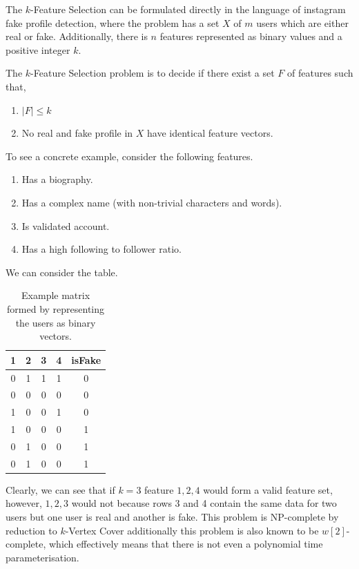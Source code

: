 \documentclass[conference]{IEEEtran}
\begin{document}
\begin{definition}\label{def:k-feature-selection}
	The $k$-Feature Selection can be formulated directly in the language of instagram fake profile detection, where the problem has a set $X$ of $m$ users which are either real or fake. Additionally, there is $n$ features represented as binary values and a positive integer $k$.

	The $k$-Feature Selection problem is to decide if there exist a set $F$ of features such that,

	\begin{enumerate}
		\item $|F| \leq k$
		\item No real and fake profile in $X$ have identical feature vectors.
	\end{enumerate}
\end{definition}

To see a concrete example, consider the following features.

\begin{enumerate}
	\item Has a biography.
	\item Has a complex name (with non-trivial characters and words).
	\item Is validated account.
	\item Has a high following to follower ratio.
\end{enumerate}

We can consider the table.

\begin{table}[h!]
	\centering
	\begin{tabular}{| c c c c | c |}
		\hline
		1 & 2 & 3 & 4 & isFake \\ [0.5ex]
		\hline
		0 & 1 & 1 & 1 & 0      \\
		0 & 0 & 0 & 0 & 0      \\
		1 & 0 & 0 & 1 & 0      \\
		1 & 0 & 0 & 0 & 1      \\
		0 & 1 & 0 & 0 & 1      \\
		0 & 1 & 0 & 0 & 1      \\ [1ex]
		\hline
	\end{tabular}
	\caption{Example matrix formed by representing the users as binary vectors.}
	\label{table:k-feat-select-example}
\end{table}

Clearly, we can see that if $k=3$ feature $1,2,4$ would form a valid feature set, however, $1,2,3$ would not because rows 3 and 4 contain the same data for two users but one user is real and another is fake. This problem is NP-complete by reduction to $k$-Vertex Cover\cite{DaviesRussell1994} additionally this problem is also known to be $w[2]$-complete\cite{CottaMoscato2003}, which effectively means that there is not even a polynomial time parameterisation.
\end{document}
